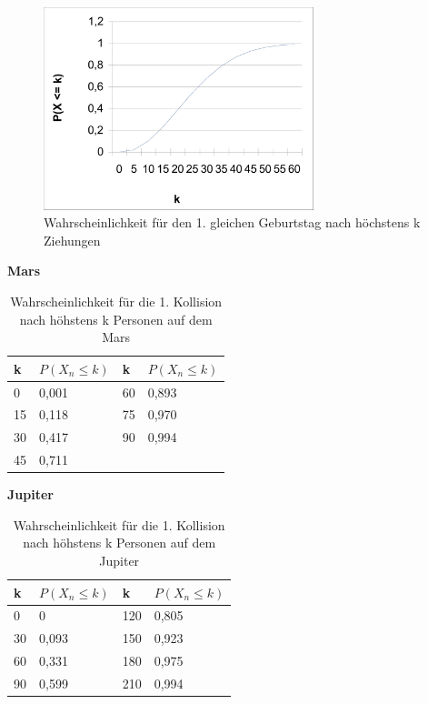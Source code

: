 \documentclass[../main.tex]{subfiles}
\begin{document}
\begin{figure}[h]
 \begin{center}
 \includegraphics[width=0.7\textwidth]{../graphics/perde.png}
\end{center}
\caption{\label{num.fpe} Wahrscheinlichkeit für den 1. gleichen Geburtstag nach höchstens k Ziehungen}
\end{figure}


\textbf{Mars}

\begin{table}[h]
\centering
\begin{tabular}{|l|l|l|l|}
\hline
k  & $P(X_{n} \leq k)$ & k  & $P(X_{n} \leq k)$ \\ \hline
0  & 0,001            & 60 & 0,893            \\
15 & 0,118            & 75 & 0,970            \\
30 & 0,417            & 90 & 0,994            \\
45 & 0,711            &    &                  \\ \hline
\end{tabular}
\caption{\label{num.tpm} Wahrscheinlichkeit für die 1. Kollision nach höhstens k Personen auf dem Mars}
\end{table}

\textbf{Jupiter}

\begin{table}[h]
\centering
\begin{tabular}{|l|l|l|l|}
\hline
k  & $P(X_{n} \leq k)$ & k   & $P(X_{n} \leq k)$\\ \hline
0  & 0                & 120 & 0,805            \\
30 & 0,093            & 150 & 0,923            \\
60 & 0,331            & 180 & 0,975            \\
90 & 0,599            & 210 & 0,994            \\ \hline
\end{tabular}
\caption{\label{num.tpj} Wahrscheinlichkeit für die 1. Kollision nach höhstens k Personen auf dem Jupiter}
\end{table}
\end{document}
